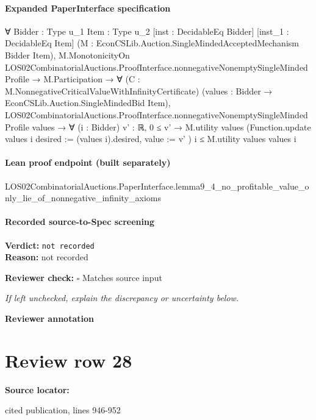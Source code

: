 \documentclass[10pt]{article}
\newcommand{\reviewerbox}{%
  \par\noindent\fbox{\parbox{0.96\linewidth}{\rule{0pt}{0.38in}}}\par
}
\newcommand{\reviewmatch}[1]{%
  \par\noindent\textbf{Reviewer check:} $\square$\; #1\par
  \noindent\emph{If left unchecked, explain the discrepancy or uncertainty below.}\par
}
\begin{document}
\paragraph{Expanded PaperInterface specification}
\begin{ReviewVerbatim}
∀ {Bidder : Type u_1} {Item : Type u_2} [inst : DecidableEq Bidder] [inst_1 : DecidableEq Item]
  (M : EconCSLib.Auction.SingleMindedAcceptedMechanism Bidder Item),
  M.MonotonicityOn LOS02CombinatorialAuctions.ProofInterface.nonnegativeNonemptySingleMindedProfile →
    M.Participation →
      ∀ (C : M.NonnegativeCriticalValueWithInfinityCertificate)
        (values : Bidder → EconCSLib.Auction.SingleMindedBid Item),
        LOS02CombinatorialAuctions.ProofInterface.nonnegativeNonemptySingleMindedProfile values →
          ∀ (i : Bidder) {v' : ℝ},
            0 ≤ v' →
              M.utility values (Function.update values i { desired := (values i).desired, value := v' }) i ≤
                M.utility values values i
\end{ReviewVerbatim}

\paragraph{Lean proof endpoint (built separately)}\begin{ReviewVerbatim}
LOS02CombinatorialAuctions.PaperInterface.lemma9_4_no_profitable_value_only_lie_of_nonnegative_infinity_axioms
\end{ReviewVerbatim}

\paragraph{Recorded source-to-Spec screening}
\textbf{Verdict:} \texttt{not recorded}
\\
\textbf{Reason:} not recorded
\reviewmatch{Matches source input}
\noindent\textbf{Reviewer annotation}\par
\reviewerbox
\clearpage
\hypertarget{source-claim-2070fa93b4f6ae62}{}
\section*{Review row 28}
\textbf{Source locator:} {\footnotesize\raggedright cited publication, lines 946-\allowbreak{}952\par}
\end{document}
